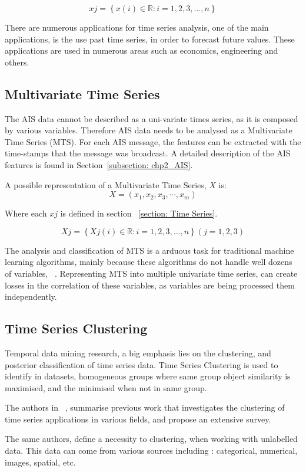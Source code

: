 \[xj = \left \{ x(i) \in \mathbb{R}: i = 1,2,3,...,n \right \} \]

There are numerous applications for time series analysis, one of the main applications, is the use past time series, in order to forecast future values. These applications are used in numerous areas such as economics, engineering and others.


\subsection{Multivariate Time Series}
The AIS data cannot be described as a uni-variate times series, as it is composed by various variables. Therefore AIS data needs to be analysed as a Multivariate Time Series (MTS).
For each AIS message, the features can be extracted with the time-stamps that the message was broadcast. A detailed description of the AIS features is found in Section~\ref{subsection: chp2_AIS}. 

A possible representation of a Multivariate Time Series, $X$ is:
\[ X = (x_{1}, x_{2}, x_{3}, \cdots,x_{m}) \]

Where each $xj$ is defined in section ~\ref{section: Time Series}.

\[ Xj = \left \{ Xj(i) \in \mathbb{R}: i = 1,2,3,...,n \right \} (j = 1,2,3) \]

The analysis and classification of MTS is a arduous task for traditional machine learning algorithms, mainly because these algorithms do not handle well dozens of variables, ~\cite{MTS1}. Representing MTS into multiple univariate time series, can create losses in the correlation of these variables, as variables are being processed them independently.

\subsection{Time Series Clustering}
\label{section: ch2 timeseriesclustering}
Temporal data mining research, a big emphasis lies on the clustering, and posterior classification of time series data. Time Series Clustering is used to identify in datasets, homogeneous groups where same group object similarity is maximised, and the minimised when not in same group.  

The authors in ~\cite{WarrenLiao2005}, summarise previous work that investigates the clustering of time series applications in various fields, and propose an extensive survey. 

The same authors, define a necessity to clustering, when working with unlabelled data. This data can come from various sources including : categorical, numerical, images, spatial, etc.

